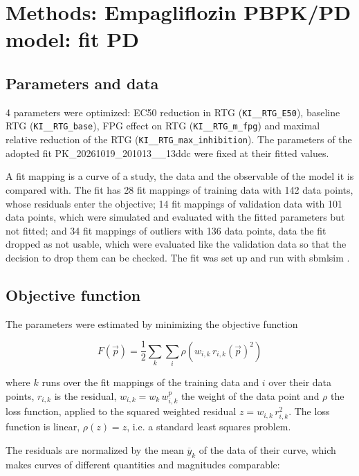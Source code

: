\section{Methods: Empagliflozin PBPK/PD model: fit PD}

\subsection{Parameters and data}

4 parameters were optimized: EC50 reduction in RTG (\texttt{KI\_\_RTG\_E50}), baseline RTG (\texttt{KI\_\_RTG\_base}), FPG effect on RTG (\texttt{KI\_\_RTG\_m\_fpg}) and maximal relative reduction of the RTG (\texttt{KI\_\_RTG\_max\_inhibition}). The parameters of the adopted fit PK\_20261019\_201013\_\_13ddc were fixed at their fitted values.

A fit mapping is a curve of a study, the data and the observable of the model it is compared with. The fit has 28 fit mappings of training data with 142 data points, whose residuals enter the objective; 14 fit mappings of validation data with 101 data points, which were simulated and evaluated with the fitted parameters but not fitted; and 34 fit mappings of outliers with 136 data points, data the fit dropped as not usable, which were evaluated like the validation data so that the decision to drop them can be checked. The fit was set up and run with sbmlsim \cite{Koenig2026_sbmlsim}.

\subsection{Objective function}

The parameters were estimated by minimizing the objective function

\begin{equation}
F(\vec{p}) = \frac{1}{2} \sum_{k} \sum_{i} \rho\left(w_{i,k}\, r_{i,k}(\vec{p})^2\right)
\end{equation}

where $k$ runs over the fit mappings of the training data and $i$ over their data points, $r_{i,k}$ is the residual, $w_{i,k} = w_k\, w^{p}_{i,k}$ the weight of the data point and $\rho$ the loss function, applied to the squared weighted residual $z = w_{i,k}\, r_{i,k}^2$. The loss function is linear, $\rho(z) = z$, i.e. a standard least squares problem.

The residuals are normalized by the mean $\overline{y}_k$ of the data of their curve, which makes curves of different quantities and magnitudes comparable:

